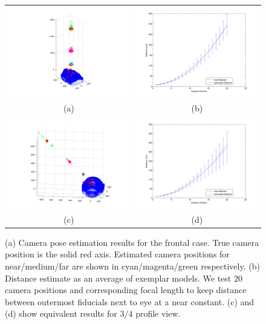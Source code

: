 \documentclass[runningheads]{llncs}
\begin{document}
\begin{figure}[ht]
\begin{tabular}{cc}
\includegraphics[width=.5\linewidth]{resources/figures/cameraloc_frontal.png} &
\includegraphics[width=.5\linewidth]{resources/figures/errorbar_frontal.png} \\
(a) & (b) \\
\includegraphics[width=.5\linewidth]{resources/figures/cameraloc_3q.png} &
\includegraphics[width=.5\linewidth]{resources/figures/errorbar_3q.png} \\
(c) & (d)
\end{tabular}
\caption{	
(a) Camera pose estimation results for the frontal case.  
True camera position is the solid red axis.  
Estimated camera positions for near/medium/far are shown in cyan/magenta/green respectively.   
(b) Distance estimate as an average of exemplar models.  
We test $20$ camera positions and corresponding focal length to keep distance between outermost fiducials next to eye at a near constant. 
(c) and (d) show equivalent results for $3/4$ profile view.}
\label{fig:results}
\end{figure}
\end{document}
